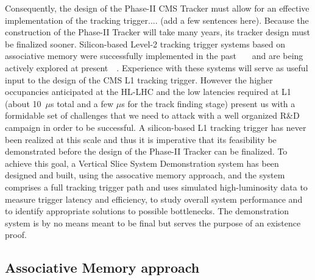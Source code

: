 Consequently, the design of the Phase-II CMS Tracker must allow for an effective implementation of the tracking trigger.... (add a few sentences here).  Because the construction of the Phase-II Tracker will take many years, its tracker design must be finalized sooner.    Silicon-based Level-2 tracking trigger systems based on associative memory were successfully implemented in the past~\cite{bib:Rist-89}~\cite{bib:Ade-06}~\cite{bib:Ade-07} and are being actively explored at present~\cite{bib:FTK-TP}~\cite{bib:FTK-TDR}. Experience with these systems will serve as useful input to the design of the CMS L1 tracking trigger. However the higher occupancies anticipated at the HL-LHC and the low latencies required at L1 (about 10~$\mu$s total and a few $\mu$s for the track finding stage) present us with a formidable set of challenges that we need to attack with a well organized R\&D campaign in order to be successful. A silicon-based L1 tracking trigger has never been realized at this scale and thus it is imperative that its feasibility be demonstrated before the design of the Phase-II Tracker can be finalized. To achieve this goal, a Vertical Slice System Demonstration system has been designed and built, using the assocative memory approach, and the  system comprises a full tracking trigger path and uses simulated high-luminosity data to measure trigger latency and efficiency, to study overall system performance and to identify appropriate solutions to possible bottlenecks. The demonstration system is by no means meant to be final  but serves the purpose of an existence proof.

\subsection{Associative Memory approach}

